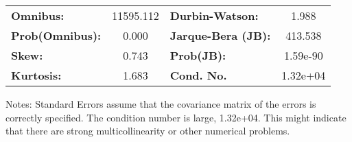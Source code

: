 \begin{center}
\begin{tabular}{lcccccc}
\bottomrule
\end{tabular}
\begin{tabular}{lclc}
\textbf{Omnibus:}       & 11595.112 & \textbf{  Durbin-Watson:     } &    1.988  \\
\textbf{Prob(Omnibus):} &    0.000  & \textbf{  Jarque-Bera (JB):  } &  413.538  \\
\textbf{Skew:}          &    0.743  & \textbf{  Prob(JB):          } & 1.59e-90  \\
\textbf{Kurtosis:}      &    1.683  & \textbf{  Cond. No.          } & 1.32e+04  \\
\bottomrule
\end{tabular}
\end{center}

Notes: \newline
 [1] Standard Errors assume that the covariance matrix of the errors is correctly specified. \newline
 [2] The condition number is large, 1.32e+04. This might indicate that there are \newline
 strong multicollinearity or other numerical problems.